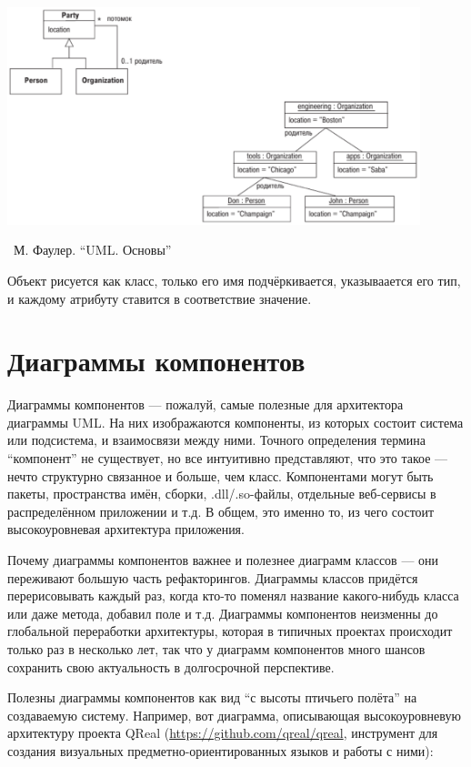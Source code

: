 \documentclass[a5paper]{article}
\newcommand{\attribution}[1] {
	\vspace{-5mm}\begin{flushright}\begin{scriptsize}%
	{\textcopyright\, #1}\end{scriptsize}\end{flushright}
}
\begin{document}
\begin{center}
	\includegraphics[width=0.9\textwidth]{objectDiagrams.png}
	\attribution{М. Фаулер. ``UML. Основы''}
\end{center}

Объект рисуется как класс, только его имя подчёркивается, указываается его тип, и каждому атрибуту ставится в соответствие значение.

\section{Диаграммы компонентов}

Диаграммы компонентов --- пожалуй, самые полезные для архитектора диаграммы UML. На них изображаются компоненты, из которых состоит система или подсистема, и взаимосвязи между ними. Точного определения термина ``компонент'' не существует, но все интуитивно представляют, что это такое --- нечто структурно связанное и больше, чем класс. Компонентами могут быть пакеты, пространства имён, сборки, .dll/.so-файлы, отдельные веб-сервисы в распределённом приложении и т.д. В общем, это именно то, из чего состоит высокоуровневая архитектура приложения.

Почему диаграммы компонентов важнее и полезнее диаграмм классов --- они переживают большую часть рефакторингов. Диаграммы классов придётся перерисовывать каждый раз, когда кто-то поменял название какого-нибудь класса или даже метода, добавил поле и т.д. Диаграммы компонентов неизменны до глобальной переработки архитектуры, которая в типичных проектах происходит только раз в несколько лет, так что у диаграмм компонентов много шансов сохранить свою актуальность в долгосрочной перспективе.

Полезны диаграммы компонентов как вид ``с высоты птичьего полёта'' на создаваемую систему. Например, вот диаграмма, описывающая высокоуровневую архитектуру проекта QReal (\url{https://github.com/qreal/qreal}, инструмент для создания визуальных предметно-ориентированных языков и работы с ними):
\end{document}

